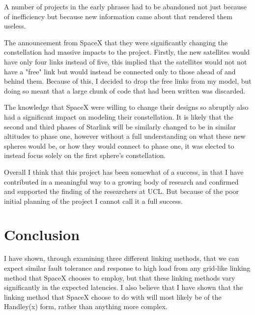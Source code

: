 \documentclass[12pt]{report}
\begin{document}
A number of projects in the early phrases had to be abandoned not just because of inefficiency but because new information came about that rendered them useless.

The announcement from SpaceX that they were significantly changing the constellation had massive impacts to the project. Firstly, the new satellites would have only four links instead of five, this implied that the satellites would not not have a "free" link but would instead be connected only to those ahead of and behind them. Because of this, I decided to drop the free links from my model, but doing so meant that a large chunk of code that had been written was discarded.

The knowledge that SpaceX were willing to change their designs so abruptly also had a significant impact on modeling their constellation. It is likely that the second and third phases of Starlink will be similarly changed to be in similar altitudes to phase one, however without a full understanding on what these new spheres would be, or how they would connect to phase one, it was elected to instead focus solely on the first sphere's constellation.

Overall I think that this project has been somewhat of a success, in that I have contributed in a meaningful way to a growing body of research and confirmed and supported the finding of the researchers at UCL. But because of the poor initial planning of the project I cannot call it a full success.

\chapter{Conclusion}

I have shown, through examining three different linking methods, that we can expect similar fault tolerance and response to high load from any grid-like linking method that SpaceX chooses to employ, but that these linking methods vary significantly in the expected latencies. I also believe that I have shown that the linking method that SpaceX choose to do with will most likely be of the Handley(x) form, rather than anything more complex.
\end{document}
